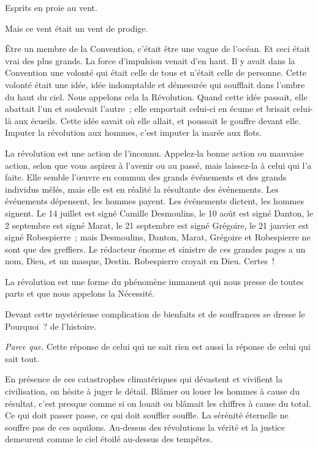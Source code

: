 \documentclass[french,twoside]{book} %
\begin{document}
\noindent Esprits en proie au vent.\par
Mais ce vent était un vent de prodige.\par
Être un membre de la Convention, c’était être une vague de l’océan. Et ceci était vrai des plus grands. La force d’impulsion venait d’en haut. Il y avait dans la Convention une volonté qui était celle de tous et n’était celle de personne. Cette volonté était une idée, idée indomptable et démesurée qui soufflait dans l’ombre du haut du ciel. Nous appelons cela la Révolution. Quand cette idée passait, elle abattait l’un et soulevait l’autre ; elle emportait celui-ci en écume et brisait celui-là aux écueils. Cette idée savait où elle allait, et poussait le gouffre devant elle. Imputer la révolution aux hommes, c’est imputer la marée aux flots.\par
La révolution est une action de l’inconnu. Appelez-la bonne action ou mauvaise action, selon que vous aspirez à l’avenir ou au passé, mais laissez-la à celui qui l’a faite. Elle semble l’œuvre en commun des grands événements et des grands individus mêlés, mais elle est en réalité la résultante des événements. Les événements dépensent, les hommes payent. Les événements dictent, les hommes signent. Le 14 juillet est signé Camille Desmoulins, le 10 août est signé Danton, le 2 septembre est signé Marat, le 21 septembre est  signé Grégoire, le 21 janvier est signé Robespierre ; mais Desmoulins, Danton, Marat, Grégoire et Robespierre ne sont que des greffiers. Le rédacteur énorme et sinistre de ces grandes pages a un nom, Dieu, et un masque, Destin. Robespierre croyait en Dieu. Certes !\par
La révolution est une forme du phénomène immanent qui nous presse de toutes parts et que nous appelons la Nécessité.\par
Devant cette mystérieuse complication de bienfaits et de souffrances se dresse le Pourquoi ? de l’histoire.\par
\emph{Parce que}. Cette réponse de celui qui ne sait rien est aussi la réponse de celui qui sait tout.\par
En présence de ces catastrophes climatériques qui dévastent et vivifient la civilisation, on hésite à juger le détail. Blâmer ou louer les hommes à cause du résultat, c’est presque comme si on louait ou blâmait les chiffres à cause du total. Ce qui doit passer passe, ce qui doit souffler souffle. La sérénité éternelle ne souffre pas de ces aquilons. Au-dessus des révolutions la vérité et la justice demeurent comme le ciel étoilé au-dessus des tempêtes.\par
\end{document}
